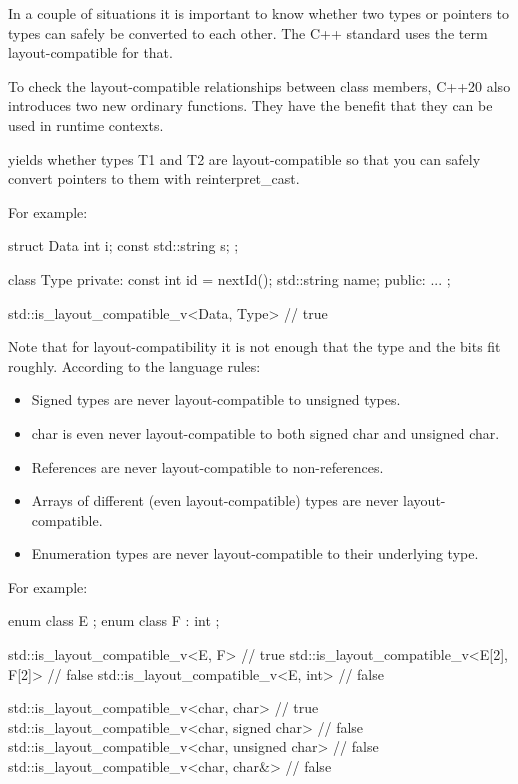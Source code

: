 
In a couple of situations it is important to know whether two types or pointers to types can safely be converted to each other. The C++ standard uses the term layout-compatible for that.

To check the layout-compatible relationships between class members, C++20 also introduces two new ordinary functions. They have the benefit that they can be used in runtime contexts.



yields whether types T1 and T2 are layout-compatible so that you can safely convert pointers to them with reinterpret\_cast.

For example:

\begin{cpp}
struct Data {
	int i;
	const std::string s;
};

class Type {
	private:
	const int id = nextId();
	std::string name;
	public:
	...
};

std::is_layout_compatible_v<Data, Type> // true
\end{cpp}

Note that for layout-compatibility it is not enough that the type and the bits fit roughly. According to the language rules:

\begin{itemize}
\item 
Signed types are never layout-compatible to unsigned types.

\item 
char is even never layout-compatible to both signed char and unsigned char.

\item 
References are never layout-compatible to non-references.

\item 
Arrays of different (even layout-compatible) types are never layout-compatible.

\item 
Enumeration types are never layout-compatible to their underlying type.
\end{itemize}

For example:

\begin{cpp}
enum class E {};
enum class F : int {};

std::is_layout_compatible_v<E, F> // true
std::is_layout_compatible_v<E[2], F[2]> // false
std::is_layout_compatible_v<E, int> // false

std::is_layout_compatible_v<char, char> // true
std::is_layout_compatible_v<char, signed char> // false
std::is_layout_compatible_v<char, unsigned char> // false
std::is_layout_compatible_v<char, char&> // false
\end{cpp}

